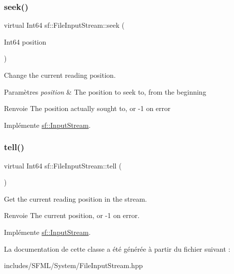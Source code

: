 \subsubsection{\texorpdfstring{seek()}{seek()}}
{\footnotesize\ttfamily virtual Int64 sf\+::\+File\+Input\+Stream\+::seek (\begin{DoxyParamCaption}\item[{Int64}]{position }\end{DoxyParamCaption})\hspace{0.3cm}{\ttfamily [virtual]}}



Change the current reading position. 


\begin{DoxyParams}{Paramètres}
{\em position} & The position to seek to, from the beginning\\
\hline
\end{DoxyParams}
\begin{DoxyReturn}{Renvoie}
The position actually sought to, or -\/1 on error 
\end{DoxyReturn}


Implémente \hyperlink{classsf_1_1InputStream_a76aba8e5d5cf9b1c5902d5e04f7864fc}{sf\+::\+Input\+Stream}.

\mbox{\label{classsf_1_1FileInputStream_a768c5fdb3be79e2d71d1bce911f8741c}} 
\subsubsection{\texorpdfstring{tell()}{tell()}}
{\footnotesize\ttfamily virtual Int64 sf\+::\+File\+Input\+Stream\+::tell (\begin{DoxyParamCaption}{ }\end{DoxyParamCaption})\hspace{0.3cm}{\ttfamily [virtual]}}



Get the current reading position in the stream. 

\begin{DoxyReturn}{Renvoie}
The current position, or -\/1 on error. 
\end{DoxyReturn}


Implémente \hyperlink{classsf_1_1InputStream_a599515b9ccdbddb6fef5a98424fd559c}{sf\+::\+Input\+Stream}.



La documentation de cette classe a été générée à partir du fichier suivant \+:\begin{DoxyCompactItemize}
\item 
includes/\+S\+F\+M\+L/\+System/File\+Input\+Stream.\+hpp\end{DoxyCompactItemize}
